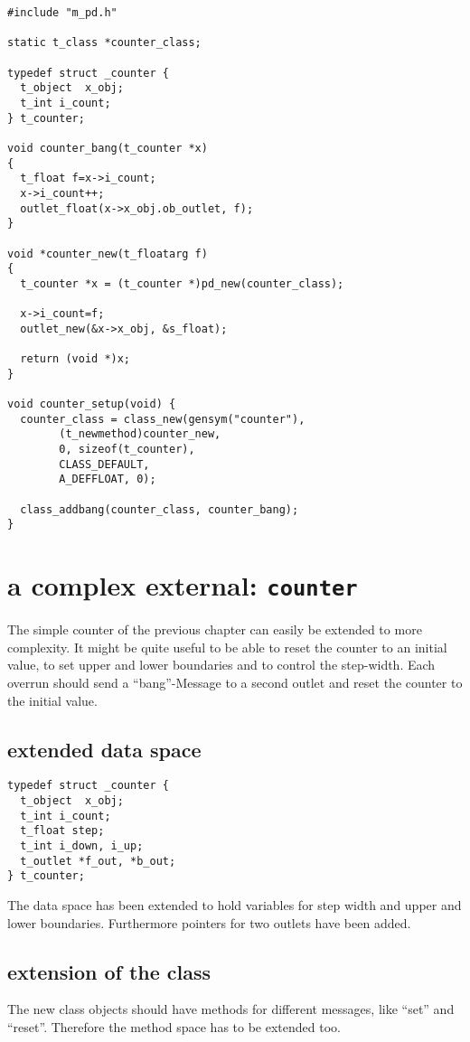 \documentclass[12pt, a4paper,english,titlepage]{article}
\begin{document}
\begin{verbatim}
#include "m_pd.h"

static t_class *counter_class;

typedef struct _counter {
  t_object  x_obj;
  t_int i_count;
} t_counter;

void counter_bang(t_counter *x)
{
  t_float f=x->i_count;
  x->i_count++;
  outlet_float(x->x_obj.ob_outlet, f);
}

void *counter_new(t_floatarg f)
{
  t_counter *x = (t_counter *)pd_new(counter_class);

  x->i_count=f;
  outlet_new(&x->x_obj, &s_float);

  return (void *)x;
}

void counter_setup(void) {
  counter_class = class_new(gensym("counter"),
        (t_newmethod)counter_new,
        0, sizeof(t_counter),
        CLASS_DEFAULT,
        A_DEFFLOAT, 0);

  class_addbang(counter_class, counter_bang);
}
\end{verbatim}


\section{a complex external: \tt counter}

The simple counter of the previous chapter can easily be extended to more complexity.
It might be quite useful to be able to reset the counter to an initial value,
to set upper and lower boundaries and to control the step-width.
Each overrun should send a ``bang''-Message to a second outlet and reset the counter to
the initial value.

\subsection{extended data space}

\begin{verbatim}
typedef struct _counter {
  t_object  x_obj;
  t_int i_count;
  t_float step;
  t_int i_down, i_up;
  t_outlet *f_out, *b_out;
} t_counter;
\end{verbatim}

The data space has been extended to hold variables for step width and 
upper and lower boundaries.
Furthermore pointers for two outlets have been added.

\subsection{extension of the class}
The new class objects should have methods for different messages,
like ``set'' and ``reset''.
Therefore the method space has to be extended too.
\end{document}

